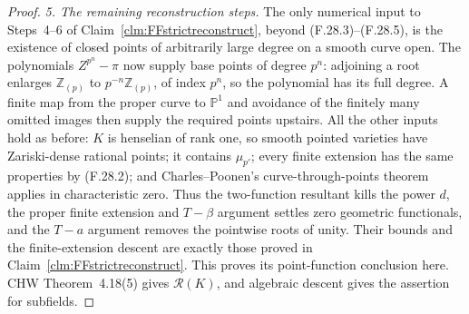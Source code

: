 \documentclass[11pt]{article}
\begin{document}
\begin{proof}
\emph{5. The remaining reconstruction steps.}
The only numerical input to Steps~4--6 of
Claim~\ref{clm:FFstrictreconstruct}, beyond
(F.28.3)--(F.28.5), is the existence of closed
points of arbitrarily large degree on a smooth
curve open. The polynomials
\(Z^{p^n}-\pi\) now supply base points of degree
\(p^n\): adjoining a root enlarges
\(\mathbb Z_{(p)}\) to
\(p^{-n}\mathbb Z_{(p)}\), of index \(p^n\),
so the polynomial has its full degree. A finite
map from the proper curve to \(\mathbb P^1\)
and avoidance of the finitely many omitted images
then supply the required points upstairs.
All the other inputs hold as before: \(K\) is
henselian of rank one, so smooth pointed varieties
have Zariski-dense rational points; it contains
\(\mu_{p'}\); every finite extension has the same
properties by (F.28.2); and Charles--Poonen's
curve-through-points theorem applies in
characteristic zero. Thus the two-function
resultant kills the power \(d\), the proper
finite extension and \(T-\beta\) argument settles
zero geometric functionals, and the \(T-a\)
argument removes the pointwise roots of unity.
Their bounds and the finite-extension descent are
exactly those proved in
Claim~\ref{clm:FFstrictreconstruct}. This proves
its point-function conclusion here. CHW
Theorem~4.18(5) gives \(\mathcal R(K)\), and
algebraic descent gives the assertion for subfields.
\end{proof}
\end{document}
